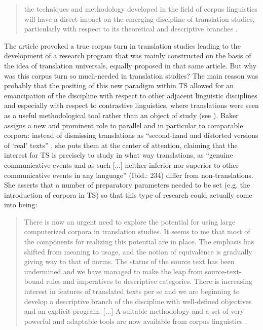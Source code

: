 \begin{quote}
the techniques and methodology developed in the field of corpus linguistics will have a direct impact on the emerging discipline of translation studies, particularly with respect to its theoretical and descriptive branches \citep[233]{baker_corpus_1993}.
\end{quote}


The article provoked a true corpus turn in translation studies leading to the development of a research program that was mainly constructed on the basis of the idea of translation universals, equally proposed in that same article. But why was this corpus turn so much-needed in translation studies? The main reason was probably that the positing of this new paradigm within TS allowed for an emancipation of the discipline with respect to other adjacent linguistic disciplines and especially with respect to contrastive linguistics, where translations were seen as a useful methodological tool rather than an object of study (see ). Baker assigns a new and prominent role to parallel and in particular to comparable corpora: instead of dismissing translations as “second-hand and distorted versions of ‘real’ texts” \citep[233]{baker_corpus_1993}, she puts them at the center of attention, claiming that the interest for TS is precisely to study in what way translations, as “genuine communicative events and as such [...] neither inferior nor superior to other communicative events in any language” (Ibid.: 234) differ from non-translations. She asserts that a number of preparatory parameters needed to be set (e.g. the introduction of corpora in TS) so that this type of research could actually come into being:


\begin{quote}
There is now an urgent need to explore the potential for using large computerized corpora in translation studies. It seems to me that most of the components for realizing this potential are in place. The emphasis has shifted from meaning to usage, and the notion of equivalence is gradually giving way to that of norms. The status of the source text has been undermined and we have managed to make the leap from source-text-bound rules and imperatives to descriptive categories. There is increasing interest in features of translated texts per se and we are beginning to develop a descriptive branch of the discipline with well-defined objectives and an explicit program. [...] A suitable methodology and a set of very powerful and adaptable tools are now available from corpus linguistics \citep[248]{baker_corpus_1993}.
\end{quote}


